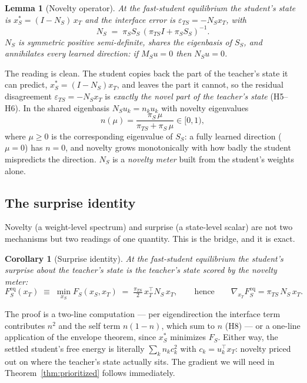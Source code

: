 \documentclass[10pt,letterpaper]{article}
\theoremstyle{plain}
\newtheorem{lemma}{Lemma}
\newtheorem{corollary}{Corollary}
\theoremstyle{remark}
\newcommand{\eps}{\varepsilon}
\newcommand{\xT}{x_T}
\newcommand{\xS}{x_S}
\newcommand{\MS}{M_S}
\renewcommand{\SS}{S_S}
\newcommand{\NS}{N_S}
\newcommand{\FS}{F_S}
\newcommand{\FSeq}{F_S^{\mathrm{eq}}}
\newcommand{\epsTS}{\eps_{TS}}
\newcommand{\piS}{\pi_S}
\newcommand{\piTS}{\pi_{TS}}
\newcommand{\tr}{^{\!\top}}
\begin{document}
\begin{lemma}[Novelty operator]
\label{lem:novelty}
At the fast-student equilibrium the student's state is
$\xS^{*}=(I-\NS)\,\xT$ and the interface error is $\epsTS=-\NS\xT$, with
\begin{equation}
\label{eq:novelty}
\NS \;=\; \piS \SS\,(\piTS I + \piS \SS)^{-1}.
\end{equation}
$\NS$ is symmetric positive semi-definite, shares the eigenbasis of $\SS$, and annihilates every
learned direction: if $\MS u=0$ then $\NS u=0$.
\end{lemma}

The reading is clean. The student copies back the part of the teacher's state it can predict,
$\xS^{*}=(I-\NS)\xT$, and leaves the part it cannot, so the residual disagreement $\epsTS=-\NS\xT$ is
\emph{exactly the novel part of the teacher's state} (H5--H6). In the shared eigenbasis
$\NS u_k=n_k u_k$ with novelty eigenvalues
\begin{equation}
\label{eq:spectrum}
n(\mu)=\frac{\piS\,\mu}{\piTS+\piS\,\mu}\in[0,1),
\end{equation}
where $\mu\ge 0$ is the corresponding eigenvalue of $\SS$: a fully learned direction ($\mu=0$) has
$n=0$, and novelty grows monotonically with how badly the student mispredicts the direction. $\NS$ is a
\emph{novelty meter} built from the student's weights alone.

\subsection{The surprise identity}
Novelty (a weight-level spectrum) and surprise (a state-level scalar) are not two mechanisms but two
readings of one quantity. This is the bridge, and it is exact.

\begin{corollary}[Surprise identity]
\label{cor:surprise}
At the fast-student equilibrium the student's surprise about the teacher's state is the teacher's state
scored by the novelty meter:
\begin{equation}
\label{eq:surpriseid}
\FSeq(\xT)\;\equiv\;\min_{\xS}\FS(\xS,\xT)\;=\;\tfrac{\piTS}{2}\,\xT\tr\NS\,\xT,
\qquad\text{hence}\qquad
\nabla_{\xT}\FSeq=\piTS\,\NS\,\xT.
\end{equation}
\end{corollary}

The proof is a two-line computation --- per eigendirection the interface term contributes $n^{2}$ and
the self term $n(1-n)$, which sum to $n$ (H8) --- or a one-line application of the envelope theorem,
since $\xS^{*}$ minimizes $\FS$. Either way, the settled student's free energy is literally
$\sum_k n_k c_k^{2}$ with $c_k=u_k\tr\xT$: novelty priced out on where the teacher's state actually
sits. The gradient we will need in Theorem~\ref{thm:prioritized} follows immediately.
\end{document}
